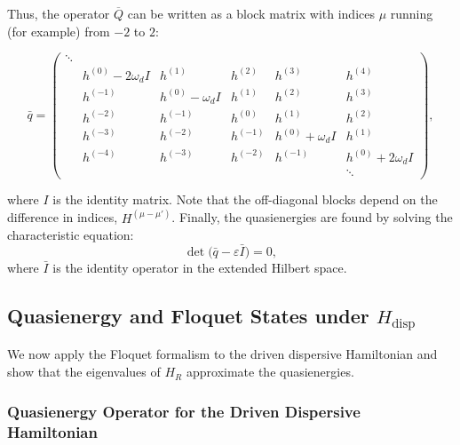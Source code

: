 Thus, the operator $\overline{Q}$ can be written as a block matrix with indices $\mu$ running (for example) from $-2$ to $2$:
\begin{widetext}
\begin{equation}
    \bar{q} = \begin{pmatrix}
    \ddots & & & & & \\
     & h^{(0)}-2\omega_d I & h^{(1)} & h^{(2)}  & h^{(3)} & h^{(4)}  \\
     & h^{(-1)}            & h^{(0)}-\omega_d I & h^{(1)} & h^{(2)} & h^{(3)}  \\
     & h^{(-2)}            & h^{(-1)}  & h^{(0)}    & h^{(1)} & h^{(2)}  \\
     & h^{(-3)}            & h^{(-2)}  & h^{(-1)}   & h^{(0)}+\omega_d I & h^{(1)} \\
     & h^{(-4)}            & h^{(-3)}  & h^{(-2)}   & h^{(-1)} & h^{(0)}+2\omega_d I \\
     & & & & & \ddots
    \end{pmatrix},
\end{equation}
\end{widetext}
where $I$ is the identity matrix. Note that the off-diagonal blocks depend on the difference in indices, $H^{(\mu-\mu')}$. Finally, the quasienergies are found by solving the characteristic equation:
\begin{equation}
    \det\bigl(\bar{q}-\varepsilon \bar{I}\bigr)=0,
\end{equation}
where $\bar{I}$ is the identity operator in the extended Hilbert space.

\subsection{Quasienergy and Floquet States under $H_{\text{disp}}$}
We now apply the Floquet formalism to the driven dispersive Hamiltonian and show that the eigenvalues of $H_R$ approximate the quasienergies.

\subsubsection{Quasienergy Operator for the Driven Dispersive Hamiltonian}

